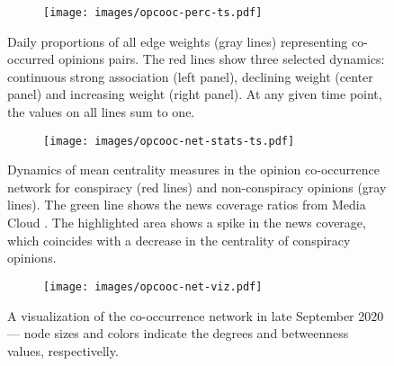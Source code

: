 \begin{figure*}[!tbp]
	\begin{subfigure}{\textwidth}
		\texttt{[image: images/opcooc-perc-ts.pdf]}
	\end{subfigure}
	\caption{
		Daily proportions of all edge weights (gray lines) representing co-occurred opinions pairs.
		The red lines show three selected dynamics: 
		continuous strong association (left panel), declining weight (center panel) and increasing weight (right panel).
		At any given time point, the values on all lines sum to one.
	}
	\label{subfig:mapping_1}
\end{figure*}

\begin{figure}[!tbp]
	\centering
	\begin{subfigure}{0.48\textwidth}
		\texttt{[image: images/opcooc-net-stats-ts.pdf]}
	\end{subfigure}
	\caption{
		Dynamics of mean centrality measures in the opinion co-occurrence network for conspiracy (red lines) and non-conspiracy opinions (gray lines).
		The green line shows the news coverage ratios from Media Cloud \citep{roberts2021media}.
		The highlighted area shows a spike in the news coverage, which coincides with a decrease in the centrality of conspiracy opinions.
	}
	\label{subfig:mapping_2}
\end{figure}
\begin{figure}[!tbp]
		\begin{subfigure}{0.49\textwidth}
		\texttt{[image: images/opcooc-net-viz.pdf]}
	\end{subfigure}
	\caption{A visualization of the co-occurrence network in late September 2020 --- node sizes and colors indicate the degrees and betweenness values, respectivelly.}
	\label{subfig:mapping_3}
\end{figure}